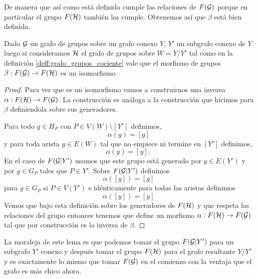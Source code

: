 \documentclass[tesis.tex]{subfiles}
\begin{document}
De manera que así como está definida cumple las relaciones de $F({\cal G})$ porque en particular el grupo $F({\cal H})$ también las cumple.
Obtenemos así que $\beta$ está bien definida.

\begin{lema}\label{lema_reduc_isomorfismo_beta}
	Dado ${\cal G}$ un grafo de grupos sobre un grafo conexo $Y$, $Y'$ un subgrafo conexo de $Y$ luego si consideramos ${\cal H}$ el grafo de grupos sobre $W = Y/Y'$ tal como en la definición \ref{deff:grafo_grupos_cociente} vale que el morfismo de grupos $\beta:F({\cal G}) \to F({\cal H})$ es un isomorfismo. 
\end{lema}
\begin{proof}
	Para ver que es un isomorfismo vamos a construirnos una inversa $\alpha:F({\cal H}) \to F({\cal G})$.
	La construcción es análoga a la construcción que hicimos para $\beta$ definiendola sobre sus generadores.
	
	Para todo $g \in H_P$ con $P \in V(W) \setminus [Y'] $ definimos,
	\begin{equation*}
		\alpha(g) = [g]  \ \ 
	\end{equation*}
	y para toda arista $ y \in E(W)$ tal que no empiece ni termine en $[Y']$ definimos,
	\begin{equation*}
		\alpha(y) = [y].  \ \ \ 
	\end{equation*}
	En el caso de $F({\cal G} | Y')$ usamos que este grupo está generado por $y \in E(Y')$ y por $g \in G_{P}$ tales que $P \in Y'$.
	Sobre $F({\cal G} | Y')$ definimos 
	\begin{equation*}
		\alpha([g]) = [g]  \ \ 
	\end{equation*}
	para $g \in G_P$ si $P \in V(Y')$ e idénticamente para todas las aristas definimos
	\begin{equation*}
		\alpha([y]) = [y]  \ \ 
	\end{equation*}
	Vemos que bajo esta definición sobre los generadores de $F({\cal H})$ y que respeta las relaciones del grupo entonces tenemos que define un morfismo $\alpha:F({\cal H}) \to F({\cal G})$ tal que por construcción es la inversa de $\beta$.
\end{proof}

La moraleja de este lema es que podemos tomar el grupo $F({\cal G} | Y')$ para un subgrafo $Y'$ conexo y después tomar el grupo $F({\cal H})$ para el grafo resultante $Y / Y'$ y es exactamente lo mismo que tomar $F({\cal G})$ en el comienzo con la ventaja que el grafo es más chico ahora.
\end{document}
